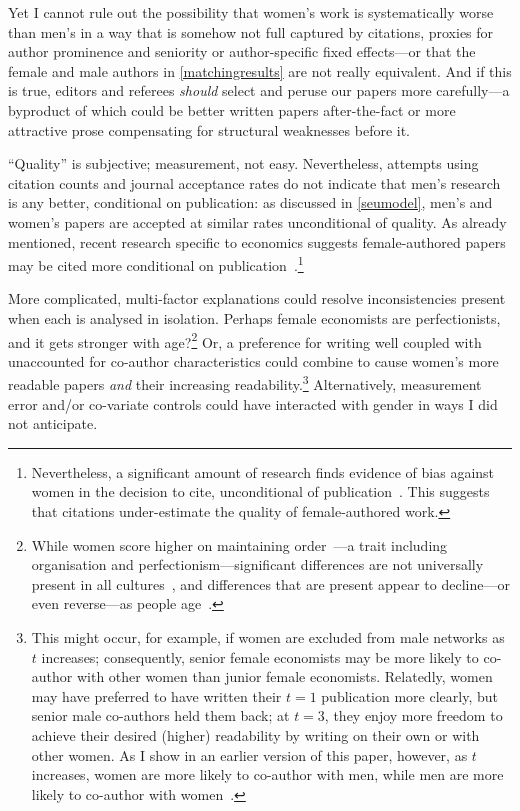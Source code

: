 \begin{appendices}
\begin{refsection}
Yet I cannot rule out the possibility that women's work is systematically worse than men's in a way that is somehow not full captured by citations, proxies for author prominence and seniority or author-specific fixed effects---or that the female and male authors in \autoref{matchingresults} are not really equivalent. And if this is true, editors and referees \emph{should} select and peruse our papers more carefully---a byproduct of which could be better written papers after-the-fact or more attractive prose compensating for structural weaknesses before it.

``Quality'' is subjective; measurement, not easy. Nevertheless, attempts using citation counts and journal acceptance rates do not indicate that men's research is any better, conditional on publication: as discussed in \autoref{seumodel}, men's and women's papers are accepted at similar rates unconditional of quality. As already mentioned, recent research specific to economics suggests female-authored papers may be cited more conditional on publication~\citep{Grossbard2018,Moon2020,Card2020}.\footnote{Nevertheless, a significant amount of research finds evidence of bias against women in the decision to cite, unconditional of publication~\citep{Ferber1986,Ferber1988,Dion2018,Koffi2021}. This suggests that citations under-estimate the quality of female-authored work.}

More complicated, multi-factor explanations could resolve inconsistencies present when each is analysed in isolation. Perhaps female economists are perfectionists, and it gets stronger with age?\footnote{While women score higher on maintaining order~\citep{Feingold1994}---a trait including organisation and perfectionism---significant differences are not universally present in all cultures~\citep{Costa2001}, and differences that are present appear to decline---or even reverse---as people age~\citep{Weisberg2011}.} Or, a preference for writing well coupled with unaccounted for co-author characteristics could combine to cause women's more readable papers \emph{and} their increasing readability.\footnote{\label{FootnoteSeniorWomen}This might occur, for example, if women are excluded from male networks as $t$ increases; consequently, senior female economists may be more likely to co-author with other women than junior female economists. Relatedly, women may have preferred to have written their $t=1$ publication more clearly, but senior male co-authors held them back; at $t=3$, they enjoy more freedom to achieve their desired (higher) readability by writing on their own or with other women. As I show in an earlier version of this paper, however, as $t$ increases, women are more likely to co-author with men, while men are more likely to co-author with women~\citep[][Table 12, p. 25]{Hengel2016}.} Alternatively, measurement error and\slash or co-variate controls could have interacted with gender in ways I did not anticipate.


\end{refsection}
\end{appendices}
